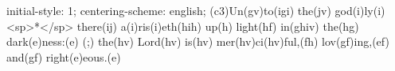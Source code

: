 initial-style: 1;
centering-scheme: english;
(c3)Un(gv)to(igi) the(jv) god(i)ly(i) <sp>*</sp> there(ij) a(i)ris(i)eth(hih) up(h) light(hf) in(ghiv) the(hg) dark(e)ness:(e) (;) the(hv) Lord(hv) is(hv) mer(hv)ci(hv)ful,(fh) lov(gf)ing,(ef) and(gf) right(e)eous.(e)
